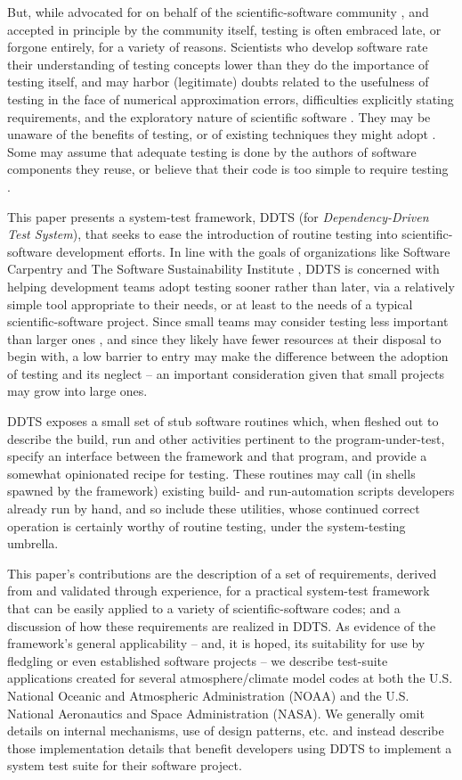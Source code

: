 \documentclass[conference]{IEEEtran}
\begin{document}
But, while advocated for on behalf of the scientific-software community \cite{bp4sc}, and accepted in principle by the community itself, testing is often embraced late, or forgone entirely, for a variety of reasons. Scientists who develop software rate their understanding of testing concepts lower than they do the importance of testing itself, and may harbor (legitimate) doubts related to the usefulness of testing in the face of numerical approximation errors, difficulties explicitly stating requirements, and the exploratory nature of scientific software \cite{how-do}. They may be unaware of the benefits of testing, or of existing techniques they might adopt \cite{bottleneck}. Some may assume that adequate testing is done by the authors of software components they reuse, or believe that their code is too simple to require testing \cite{comp-sci-survey}.

This paper presents a system-test framework, DDTS (for \emph{Dependency-Driven Test System}), that seeks to ease the introduction of routine testing into scientific-software development efforts. In line with the goals of organizations like Software Carpentry \cite{sw-carp} and The Software Sustainability Institute \cite{ssi}, DDTS is concerned with helping development teams adopt testing sooner rather than later, via a relatively simple tool appropriate to their needs, or at least to the needs of a typical scientific-software project. Since small teams may consider testing less important than larger ones \cite{how-do}, and since they likely have fewer resources at their disposal to begin with, a low barrier to entry may make the difference between the adoption of testing and its neglect -- an important consideration given that small projects may grow into large ones.

DDTS exposes a small set of stub software routines which, when fleshed out to describe the build, run and other activities pertinent to the program-under-test, specify an interface between the framework and that program, and provide a somewhat opinionated recipe for testing. These routines may call (in shells spawned by the framework) existing build- and run-automation scripts developers already run by hand, and so include these utilities, whose continued correct operation is certainly worthy of routine testing, under the system-testing umbrella.

This paper's contributions are the description of a set of requirements, derived from and validated through experience, for a practical system-test framework that can be easily applied to a variety of scientific-software codes; and a discussion of how these requirements are realized in DDTS. As evidence of the framework's general applicability -- and, it is hoped, its suitability for use by fledgling or even established software projects -- we describe test-suite applications created for several atmosphere/climate model codes at both the U.S. National Oceanic and Atmospheric Administration (NOAA) and the U.S. National Aeronautics and Space Administration (NASA). We generally omit details on internal mechanisms, use of design patterns, etc. and instead describe those implementation details that benefit developers using DDTS to implement a system test suite for their software project.
\end{document}
